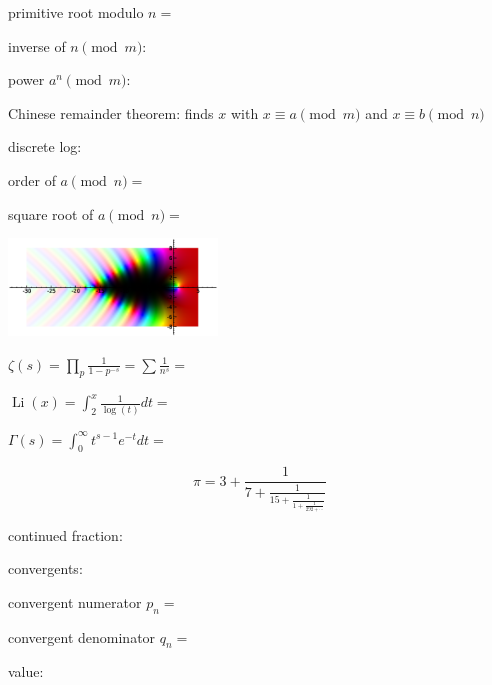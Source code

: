 \documentclass[a4paper]{article}
\begin{document}
\begin{multicols*}{3}
primitive root modulo $n = $ 

inverse of $n\pmod{m}$: 

power $a^n\pmod{m}$: 

Chinese remainder theorem: 
\BreakLineAndIndent
finds $x$ with $x\equiv a\pmod{m}$ and $x\equiv b\pmod{n}$

discrete log: 

order of $a\pmod{n}=$

square root of $a\pmod{n}=$~


{\tiny{}}
\BreakLineAndIndent
\includegraphics[width=15em]{zeta.eps}

$\displaystyle \zeta(s) = \prod_{p} \frac{1}{1-p^{-s}} = \sum \frac{1}{n^s} = $ 

$\displaystyle \operatorname{Li}(x) = \int_{2}^{x} \frac{1}{\log(t)} dt = $ 

$\displaystyle \Gamma(s) = \int_0^{\infty} t^{s-1}e^{-t}dt = $ 


\vspace{6ex}
\makebox{}


{\tiny {}}
{\small $$
\pi = 3+ \frac{\displaystyle 1}{\displaystyle 7+ \frac{\displaystyle 1}{\displaystyle 15+ \frac{\displaystyle 1}{\displaystyle 1+ \frac{\displaystyle 1}{\displaystyle 292 + \cdots}}}}$$}

continued fraction: \EX{)}

convergents: 

convergent numerator $p_n =$ 

convergent denominator $q_n =$ 

value: 

 


\end{multicols*}
\end{document}
